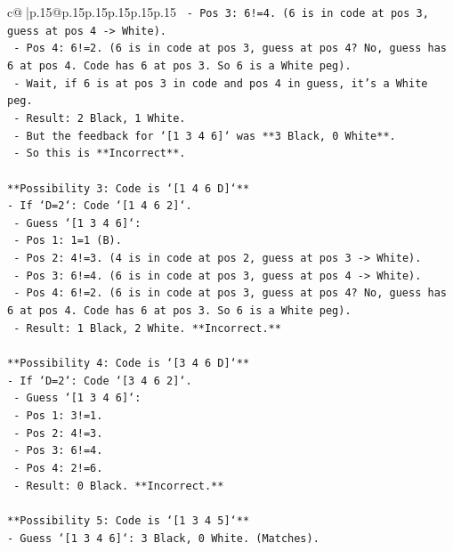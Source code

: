 \documentclass{article}
\begin{document}
{\begin{supertabular}{c@{$\;$}|p{.15\linewidth}@{}p{.15\linewidth}p{.15\linewidth}p{.15\linewidth}p{.15\linewidth}p{.15\linewidth}}
{{{\texttt{        {-} Pos 3: 6!=4. (6 is in code at pos 3, guess at pos 4 {-}> White).} \\
\texttt{        {-} Pos 4: 6!=2. (6 is in code at pos 3, guess at pos 4? No, guess has 6 at pos 4. Code has 6 at pos 3. So 6 is a White peg).} \\
\texttt{        {-} Wait, if 6 is at pos 3 in code and pos 4 in guess, it's a White peg.} \\
\texttt{        {-} Result: 2 Black, 1 White.} \\
\texttt{        {-} But the feedback for `{[}1 3 4 6{]}` was **3 Black, 0 White**.} \\
\texttt{        {-} So this is **Incorrect**.} \\
\\ 
\texttt{**Possibility 3: Code is `{[}1 4 6 D{]}`**} \\
\texttt{{-} If `D=2`: Code `{[}1 4 6 2{]}`.} \\
\texttt{    {-} Guess `{[}1 3 4 6{]}`:} \\
\texttt{        {-} Pos 1: 1=1 (B).} \\
\texttt{        {-} Pos 2: 4!=3. (4 is in code at pos 2, guess at pos 3 {-}> White).} \\
\texttt{        {-} Pos 3: 6!=4. (6 is in code at pos 3, guess at pos 4 {-}> White).} \\
\texttt{        {-} Pos 4: 6!=2. (6 is in code at pos 3, guess at pos 4? No, guess has 6 at pos 4. Code has 6 at pos 3. So 6 is a White peg).} \\
\texttt{        {-} Result: 1 Black, 2 White. **Incorrect.**} \\
\\ 
\texttt{**Possibility 4: Code is `{[}3 4 6 D{]}`**} \\
\texttt{{-} If `D=2`: Code `{[}3 4 6 2{]}`.} \\
\texttt{    {-} Guess `{[}1 3 4 6{]}`:} \\
\texttt{        {-} Pos 1: 3!=1.} \\
\texttt{        {-} Pos 2: 4!=3.} \\
\texttt{        {-} Pos 3: 6!=4.} \\
\texttt{        {-} Pos 4: 2!=6.} \\
\texttt{        {-} Result: 0 Black. **Incorrect.**} \\
\\ 
\texttt{**Possibility 5: Code is `{[}1 3 4 5{]}`**} \\
\texttt{{-} Guess `{[}1 3 4 6{]}`: 3 Black, 0 White. (Matches).} \\
}}}
\end{supertabular}}
\end{document}
